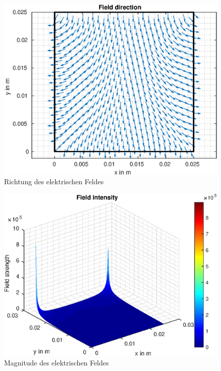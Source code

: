 \begin{figure}[H]
	\centering
	\includegraphics[scale=1]{pics/Bsp_1_a/fig_3.eps}
	\caption{Richtung des elektrischen Feldes}
\end{figure}

\begin{figure}[H]
	\centering
	\includegraphics[scale=1]{pics/Bsp_1_a/fig_4.eps}
	\caption{Magnitude des elektrischen Feldes}
	\label{fig:mag_E_1}
\end{figure}



